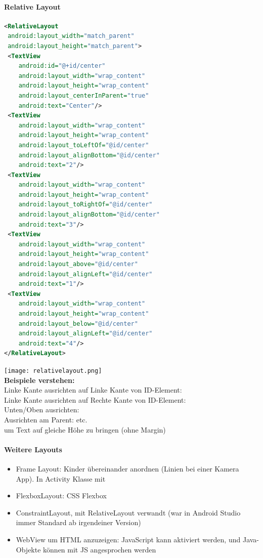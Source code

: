 \paragraph{Relative Layout}
\begin{lstlisting}[language=xml]
<RelativeLayout
 android:layout_width="match_parent"
 android:layout_height="match_parent">
 <TextView
    android:id="@+id/center"
    android:layout_width="wrap_content"
    android:layout_height="wrap_content"
    android:layout_centerInParent="true"
    android:text="Center"/>
 <TextView
    android:layout_width="wrap_content"
    android:layout_height="wrap_content"
    android:layout_toLeftOf="@id/center"
    android:layout_alignBottom="@id/center"
    android:text="2"/>
 <TextView
    android:layout_width="wrap_content"
    android:layout_height="wrap_content"
    android:layout_toRightOf="@id/center"
    android:layout_alignBottom="@id/center"
    android:text="3"/>
 <TextView
    android:layout_width="wrap_content"
    android:layout_height="wrap_content"
    android:layout_above="@id/center"
    android:layout_alignLeft="@id/center"
    android:text="1"/>
 <TextView
    android:layout_width="wrap_content"
    android:layout_height="wrap_content"
    android:layout_below="@id/center"
    android:layout_alignLeft="@id/center"
    android:text="4"/>
</RelativeLayout>
\end{lstlisting}
\texttt{[image: relativelayout.png]} \\
\textbf{Beispiele verstehen:} \\
Linke Kante ausrichten auf Linke Kante von ID-Element:  \\
Linke Kante ausrichten auf Rechte Kante von ID-Element: \\
Unten/Oben ausrichten: \\
Ausrichten am Parent:  etc. \\
 um Text auf gleiche Höhe zu bringen (ohne Margin)
\paragraph{Weitere Layouts}
\begin{itemize}
  \item Frame Layout: Kinder übereinander anordnen (Linien bei einer Kamera App). In Activity Klasse mit 
  \item FlexboxLayout: CSS Flexbox
  \item ConstraintLayout, mit RelativeLayout verwandt (war in Android Studio immer Standard ab irgendeiner Version)
  \item WebView um HTML anzuzeigen: JavaScript kann aktiviert werden, und Java-Objekte können mit JS angesprochen werden
\end{itemize}

